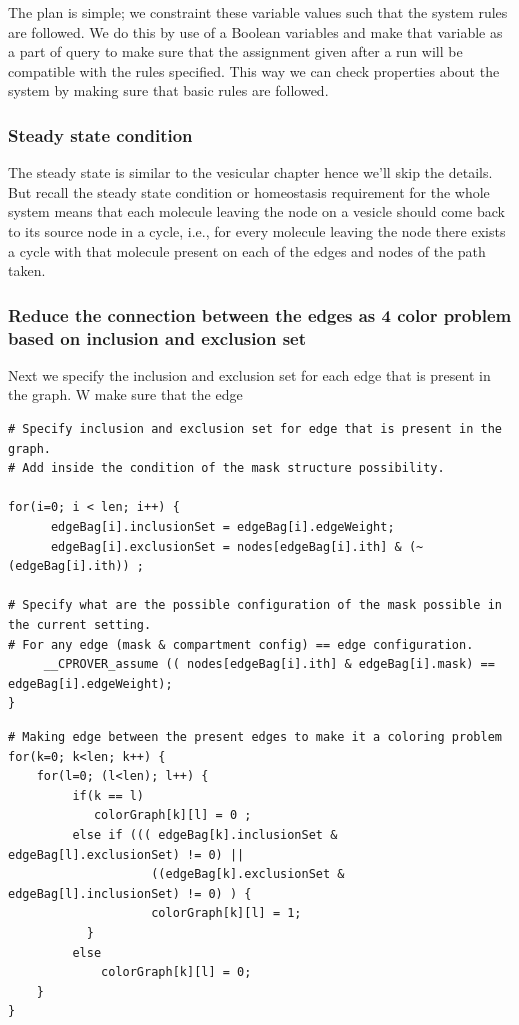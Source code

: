 \documentclass[preprint,12pt]{elsarticle}
\begin{document}
The plan is simple; we constraint these variable values such that the system rules are followed. We do this by use of a Boolean variables and make that variable as a part of query to make sure that the assignment given after a run will be compatible with the rules specified. This way we can check properties about the system by making sure that basic rules are followed.  

\subsubsection{Steady state condition}
The steady state is similar to the vesicular chapter hence we'll skip the details. But recall the steady state condition or homeostasis requirement for the whole system means that each molecule leaving the node on a vesicle should come back to its source node in a cycle, i.e., for every molecule leaving the node there exists a cycle with that molecule present on each of the edges and nodes of the path taken. 

\subsubsection{Reduce the connection between the edges as 4 color problem based on inclusion and exclusion set}
Next we specify the inclusion and exclusion set for each edge that is present in the graph. W make sure that the edge  

\begin{lstlisting}[mathescape,
  breaklines,
  frame=single,
  caption= \textbf{Setting inclusion and exclusion masks.}
]
# Specify inclusion and exclusion set for edge that is present in the graph.
# Add inside the condition of the mask structure possibility.
      
for(i=0; i < len; i++) {
      edgeBag[i].inclusionSet = edgeBag[i].edgeWeight;
      edgeBag[i].exclusionSet = nodes[edgeBag[i].ith] & (~ (edgeBag[i].ith)) ;
      
# Specify what are the possible configuration of the mask possible in the current setting.
# For any edge (mask & compartment config) == edge configuration. 
     __CPROVER_assume (( nodes[edgeBag[i].ith] & edgeBag[i].mask) == edgeBag[i].edgeWeight); 
}
\end{lstlisting}


\begin{lstlisting}[mathescape,
  breaklines,
  frame=single,
  caption= \textbf{Reducing the mask problem to n-color problem.}
]
# Making edge between the present edges to make it a coloring problem
for(k=0; k<len; k++) {
    for(l=0; (l<len); l++) {
         if(k == l) 
            colorGraph[k][l] = 0 ;
         else if ((( edgeBag[k].inclusionSet & edgeBag[l].exclusionSet) != 0) ||
                    ((edgeBag[k].exclusionSet & edgeBag[l].inclusionSet) != 0) ) {
                    colorGraph[k][l] = 1;
		   }
		 else 
			 colorGraph[k][l] = 0; 
    }
}
\end{lstlisting}
\end{document}
